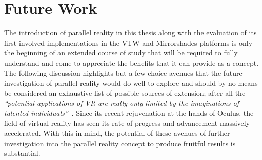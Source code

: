 
\section{Future Work}

The introduction of parallel reality in this thesis along with the evaluation of its first involved implementations in the VTW and Mirrorshades platforms is only the beginning of an extended course of study that will be required to fully understand and come to appreciate the benefits that it can provide as a concept. The following discussion highlights but a few choice avenues that the future investigation of parallel reality would do well to explore and should by no means be considered an exhaustive list of possible sources of extension; after all the \textit{``potential applications of VR are really only limited by the imaginations of talented individuals''}~\cite{Giuseppe2014a}. Since its recent rejuvenation at the hands of Oculus, the field of virtual reality has seen its rate of progress and advancement massively accelerated. With this in mind, the potential of these avenues of further investigation into the parallel reality concept to produce fruitful results is substantial.

